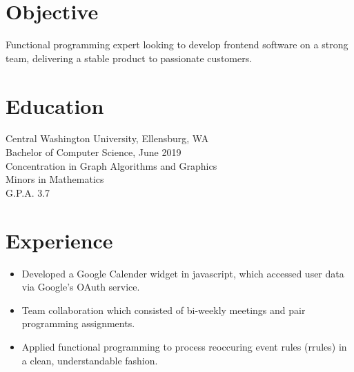 \documentclass[11pt, a4paper]{article}
\begin{document}

\section*{Objective}
\vspace{-0.05in}
\hspace*{0.1in}
\begin{minipage}{.8\textwidth}
  Functional programming expert looking to develop frontend software on a strong team, delivering a stable product to passionate customers.
\end{minipage}
\vspace{-0.15in}

\section*{Education}
\vspace{-0.05in}
\hspace*{0.1in}
\begin{minipage}{.8\textwidth}
  Central Washington University, Ellensburg, WA \\
  Bachelor of Computer Science, June 2019 \\
  Concentration in Graph Algorithms and Graphics \\
  Minors in Mathematics \\
  G.P.A. 3.7
\end{minipage}
\vspace{-0.1in}

\section*{Experience}

\noindent
{
  \hfill
  \hfill
}
\vspace{-0.1in}
\begin{itemize}
  \item Developed a Google Calender widget in javascript, which accessed user data via Google's OAuth service.
        \vspace{-0.1in}
  \item Team collaboration which consisted of bi-weekly meetings and pair programming assignments.
        \vspace{-0.1in}
  \item Applied functional programming to process reoccuring event rules (rrules) in a clean, understandable fashion.
\end{itemize}
\vspace{-0.05in}
\end{document}
